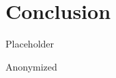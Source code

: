 \documentclass[sigconf]{acmart}
\begin{document}
\section{Conclusion}
\label{sec:conclusion}
Placeholder




\begin{acks}
Anonymized
\end{acks}




\appendix
\end{document}
